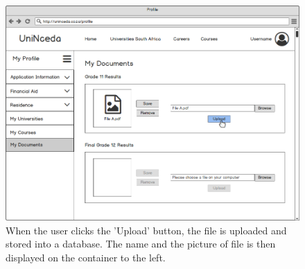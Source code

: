 \documentclass[a4paper, 12pt]{article}
\begin{document}
\begin{figure}[H]
\centering
\includegraphics[scale=0.5]{ProfileMyDocumentsUpload}
\caption{When the user clicks the 'Upload' button, the file is uploaded and stored into a database. The name and the picture of file is then displayed on the container to the left.}
\label{ProfileMyDocumentsUpload}

\end{figure}
\end{document}
